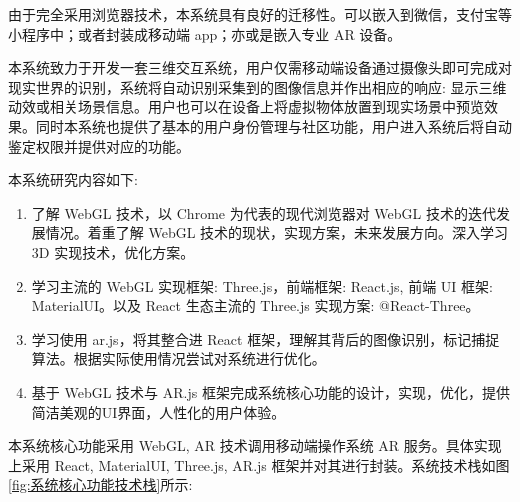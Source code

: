 由于完全采用浏览器技术，本系统具有良好的迁移性。可以嵌入到微信，支付宝等小程序中；或者封装成移动端 app；亦或是嵌入专业 AR 设备。

本系统致力于开发一套三维交互系统，用户仅需移动端设备通过摄像头即可完成对现实世界的识别，系统将自动识别采集到的图像信息并作出相应的响应: 显示三维动效或相关场景信息。用户也可以在设备上将虚拟物体放置到现实场景中预览效果。同时本系统也提供了基本的用户身份管理与社区功能，用户进入系统后将自动鉴定权限并提供对应的功能。

本系统研究内容如下:

\begin{enumerate}
  \item 了解 WebGL 技术，以 Chrome 为代表的现代浏览器对 WebGL 技术的迭代发展情况。着重了解 WebGL 技术的现状，实现方案，未来发展方向。深入学习 3D 实现技术，优化方案。
  \item 学习主流的 WebGL 实现框架: Three.js，前端框架: React.js, 前端 UI 框架: MaterialUI。以及 React 生态主流的 Three.js 实现方案: @React-Three。
  \item 学习使用 ar.js，将其整合进 React 框架，理解其背后的图像识别，标记捕捉算法。根据实际使用情况尝试对系统进行优化。
  \item 基于 WebGL 技术与 AR.js 框架完成系统核心功能的设计，实现，优化，提供简洁美观的UI界面，人性化的用户体验。
\end{enumerate}

本系统核心功能采用 WebGL, AR 技术调用移动端操作系统 AR 服务。具体实现上采用 React, MaterialUI, Three.js, AR.js 框架并对其进行封装。系统技术栈如图\ref{fig:系统核心功能技术栈}所示:

